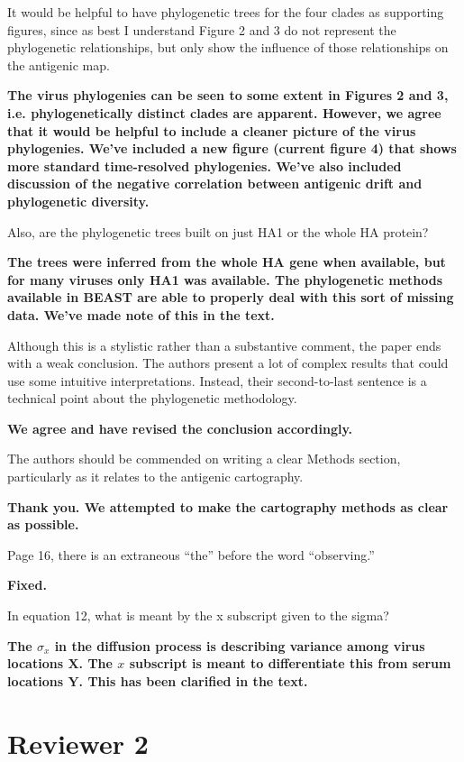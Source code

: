 \documentclass[11pt,oneside,letterpaper]{article}
\begin{document}
It would be helpful to have phylogenetic trees for the four clades as supporting figures, since as best I understand Figure 2 and 3 do not represent the phylogenetic relationships, but only show the influence of those relationships on the antigenic map. 

\textbf{The virus phylogenies can be seen to some extent in Figures 2 and 3, i.e. phylogenetically distinct clades are apparent.  However, we agree that it would be helpful to include a cleaner picture of the virus phylogenies.  We've included a new figure (current figure 4) that shows more standard time-resolved phylogenies.  We've also included discussion of the negative correlation between antigenic drift and phylogenetic diversity.}

Also, are the phylogenetic trees built on just HA1 or the whole HA protein?

\textbf{The trees were inferred from the whole HA gene when available, but for many viruses only HA1 was available.  The phylogenetic methods available in BEAST are able to properly deal with this sort of missing data.  We've made note of this in the text.}

Although this is a stylistic rather than a substantive comment, the paper ends with a weak conclusion. The authors present a lot of complex results that could use some intuitive interpretations. Instead, their second-to-last sentence is a technical point about the phylogenetic methodology.

\textbf{We agree and have revised the conclusion accordingly.}

The authors should be commended on writing a clear Methods section, particularly as it relates to the antigenic cartography.

\textbf{Thank you. We attempted to make the cartography methods as clear as possible.}

Page 16, there is an extraneous ``the'' before the word ``observing.''

\textbf{Fixed.}

In equation 12, what is meant by the x subscript given to the sigma?

\textbf{The $\sigma_x$ in the diffusion process is describing variance among virus locations $\mathbf{X}$.  The $x$ subscript is meant to differentiate this from serum locations $\mathbf{Y}$.  This has been clarified in the text.}

\section*{Reviewer 2}
\end{document}
